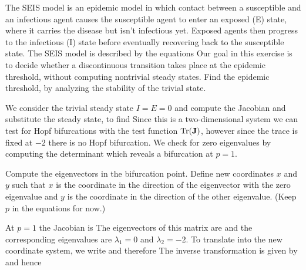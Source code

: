The SEIS model is an epidemic model in which contact between a susceptible and an infectious agent causes the susceptible agent to enter an exposed (E) state, where it carries the disease but isn't infectious yet. Exposed agents then progress to the infectious (I) state before eventually recovering  back to the susceptible state. The SEIS model is described by the equations 
Our goal in this exercise is to decide whether a discontinuous transition takes place at the epidemic threshold, without computing nontrivial steady states.
\subquestion 
Find the epidemic threshold, by analyzing the stability of the trivial state.

\solution 
We consider the trivial steady state $I=E=0$ and compute the Jacobian 
and substitute the steady state, to find 
Since this is a two-dimensional system we can test for Hopf bifurcations with the test function ${\rm Tr}(\bf J)$, however since the trace is fixed at $-2$ there is no Hopf bifurcation. We check for zero eigenvalues by computing the determinant
which reveals a bifurcation at $p=1$. 

\subquestion 
Compute the eigenvectors in the bifurcation point. Define new coordinates $x$ and $y$ such that $x$ is the coordinate in the direction of the eigenvector with the zero eigenvalue and $y$ is the coordinate in the direction of the other eigenvalue. (Keep $p$ in the equations for now.)

\solution 
At $p=1$ the Jacobian is 
The eigenvectors of this matrix are 
and the corresponding eigenvalues are $\lambda_1=0$ and $\lambda_2=-2$. To translate into the new coordinate system, we write 
and therefore 
The inverse transformation is given by 
and hence 

